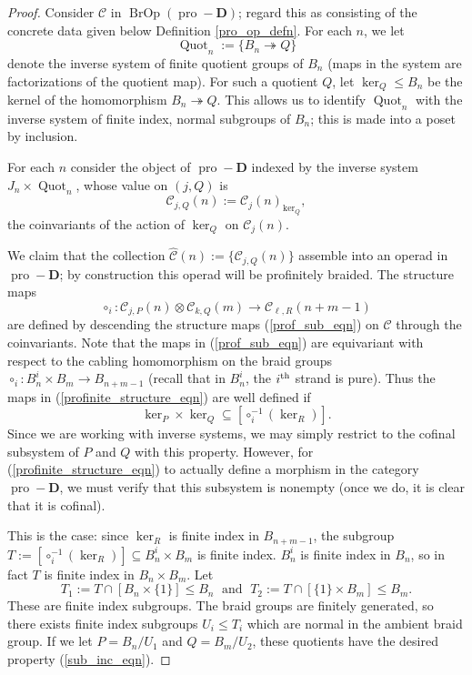 \documentclass[12pt]{article}
\DeclareMathOperator{\Quot}{Quot}
\DeclareMathOperator{\pro}{pro}
\DeclareMathOperator{\BrOp}{BrOp}
\newcommand{\CC} {\mathcal{C}}
\newcommand{\bD} {\mathbf{D}}
\newcommand{\proD}{\pro\!-\bD}
\newcommand{\beqn}{\begin{equation}}
\newcommand{\eeqn}{\end{equation}}
\newcommand{\nth}{\textsuperscript{th}}
\theoremstyle{plain}
\theoremstyle{definition}
\theoremstyle{remark}
\begin{document}
\begin{proof}

Consider $\CC$ in $\BrOp(\proD)$; regard this as consisting of the concrete data given below Definition \ref{pro_op_defn}.  For each $n$, we let 
%
$$\Quot_n := \{ B_n \twoheadrightarrow Q\}$$
%
denote the inverse system of finite quotient groups of $B_n$ (maps in the system are factorizations of the quotient map).  For such a quotient $Q$, let $\ker_Q \leq B_n$ be the kernel of the homomorphism $B_n \twoheadrightarrow Q$.  This allows us to identify $\Quot_n$ with the inverse system of finite index, normal subgroups of $B_n$; this is made into a poset by inclusion.

For each $n$ consider the object of $\proD$ indexed by the inverse system $J_n \times \Quot_n$, whose value on $(j, Q)$ is
%
$$\CC_{j, Q}(n) := \CC_j(n)_{\ker_Q},$$
%
the coinvariants of the action of $\ker_Q$ on $\CC_j(n)$.

We claim that the collection $\widehat{\CC}(n) := \{\CC_{j, Q}(n)\}$ assemble into an operad in $\proD$; by construction this operad will be profinitely braided.  The structure maps
%
\beqn \label{profinite_structure_eqn} \circ_i: \CC_{j,P}(n) \otimes \CC_{k, Q}(m) \to \CC_{\ell, R}(n+m-1)\eeqn
%
are defined by descending the structure maps (\ref{prof_sub_eqn}) on $\CC$ through the coinvariants.  Note that the maps in (\ref{prof_sub_eqn}) are equivariant with respect to the cabling homomorphism on the braid groups $\circ_i: B_n^i \times B_m \to B_{n+m-1}$ (recall that in $B_n^i$, the $i\nth$ strand is pure).  Thus the maps in (\ref{profinite_structure_eqn}) are well defined if 
%
\beqn \label{sub_inc_eqn}\ker_P \times \ker_Q \subseteq [\circ_i^{-1}(\ker_R)].\eeqn
%
Since we are working with inverse systems, we may simply restrict to the cofinal subsystem of $P$ and $Q$ with this property.  However, for (\ref{profinite_structure_eqn}) to actually define a morphism in the category $\proD$, we must verify that this subsystem is nonempty (once we do, it is clear that it is cofinal).

This is the case: since $\ker_R$ is finite index in $B_{n+m-1}$, the subgroup $T:= [\circ_i^{-1}(\ker_R)] \subseteq B_n^i \times B_m$ is finite index.  $B_n^i$ is finite index in $B_n$, so in fact $T$ is finite index in $B_n \times B_m$.  Let 
%
$$T_1 := T \cap [B_n \times \{1\}] \leq B_n \; \mbox{ and } \; T_2 := T \cap [\{1 \} \times B_m] \leq B_m.$$
%
These are finite index subgroups.  The braid groups are finitely generated, so there exists finite index subgroups $U_i \leq T_i$ which are normal in the ambient braid group.  If we let $P = B_n/U_1$ and $Q = B_m/U_2$, these quotients have the desired property (\ref{sub_inc_eqn}).


\end{proof}
\end{document}
